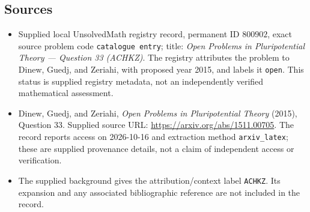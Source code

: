 \documentclass[11pt]{article}
\begin{document}
\subsection{Sources}
\begin{itemize}
\item Supplied local UnsolvedMath registry record, permanent ID \(800902\), exact source problem code \texttt{catalogue entry}; title: \emph{Open Problems in Pluripotential Theory --- Question 33 (ACHKZ)}. The registry attributes the problem to Dinew, Guedj, and Zeriahi, with proposed year 2015, and labels it \texttt{open}. This status is supplied registry metadata, not an independently verified mathematical assessment.
\item Dinew, Guedj, and Zeriahi, \emph{Open Problems in Pluripotential Theory} (2015), Question 33. Supplied source URL: \url{https://arxiv.org/abs/1511.00705}. The record reports access on 2026-10-16 and extraction method \texttt{arxiv\_latex}; these are supplied provenance details, not a claim of independent access or verification.
\item The supplied background gives the attribution/context label \texttt{ACHKZ}. Its expansion and any associated bibliographic reference are not included in the record.
\end{itemize}
\end{document}
